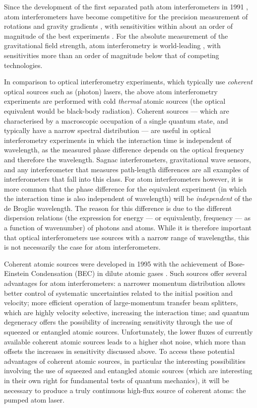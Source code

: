 Since the development of the first separated path atom interferometers in 1991 \citep{Carnal:1991,Keith:1991,Riehle:1991,Kasevich:1991}, atom interferometers have become competitive for the precision measurement of rotations \citep{McGuirk:2002} and gravity gradients \citep{Gustavson:2000}, with sensitivities within about an order of magnitude of the best experiments \citep{Schreiber:2008,Moody:1993,Kann:1994}.  For the absolute measurement of the gravitational field strength, atom interferometry is world-leading \citep{Muller:2008}, with sensitivities more than an order of magnitude below that of competing technologies.

In comparison to optical interferometry experiments, which typically use \emph{coherent} optical sources such as (photon) lasers, the above atom interferometry experiments are performed with cold \emph{thermal} atomic sources (the optical equivalent would be black-body radiation).  Coherent sources --- which are characterised by a macroscopic occupation of a single quantum state, and typically have a narrow spectral distribution --- are useful in optical interferometry experiments in which the interaction time is independent of wavelength, as the measured phase difference depends on the optical frequency and therefore the wavelength.  Sagnac interferometers, gravitational wave sensors, and any interferometer that measures path-length differences are all examples of interferometers that fall into this class.  For atom interferometers however, it is more common that the phase difference for the equivalent experiment (in which the interaction time is also independent of wavelength) will be \emph{independent} of the de Broglie wavelength.  The reason for this difference is due to the different dispersion relations (the expression for energy --- or equivalently, frequency --- as a function of wavenumber) of photons and atoms.  While it is therefore important that optical interferometers use sources with a narrow range of wavelengths, this is not necessarily the case for atom interferometers.

Coherent atomic sources were developed in 1995 with the achievement of Bose-Einstein Condensation (BEC) in dilute atomic gases \citep{Anderson:1995vn,Bradley:1995ys,Davis:1995}.  Such sources offer several advantages for atom interferometers: a narrower momentum distribution allows better control of systematic uncertainties related to the initial position and velocity; more efficient operation of large-momentum transfer beam splitters, which are highly velocity selective, increasing the interaction time; and quantum degeneracy offers the possibility of increasing sensitivity through the use of squeezed or entangled atomic sources.  Unfortunately, the lower fluxes of currently available coherent atomic sources leads to a higher shot noise, which more than offsets the increases in sensitivity discussed above.  To access these potential advantages of coherent atomic sources, in particular the interesting possibilities involving the use of squeezed and entangled atomic sources (which are interesting in their own right for fundamental tests of quantum mechanics), it will be necessary to produce a truly continuous high-flux source of coherent atoms: the pumped atom laser.  

